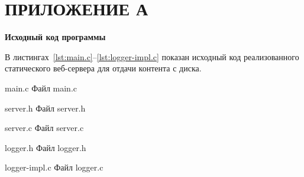 \documentclass{bmstu}
\begin{document}
{\centering \printbibliography[title=СПИСОК ИСПОЛЬЗОВАННЫХ ИСТОЧНИКОВ,heading=bibintoc]}

{\centering \chapter*{ПРИЛОЖЕНИЕ А}}
\begin{center}
\textbf{Исходный код программы}
\end{center}

В листингах~\ref{lst:main.c}--\ref{lst:logger-impl.c} показан исходный код реализованного статического веб-сервера для отдачи контента с диска.

	{main.c}
	{Файл main.c}
	
	{server.h}
	{Файл server.h}
	
	{server.c}
	{Файл server.c}
	
	{logger.h}
	{Файл logger.h}
	
	{logger-impl.c}
	{Файл logger.c}
\end{document}
